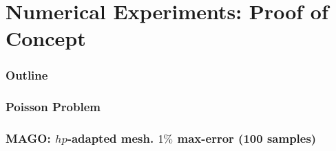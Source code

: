 \documentclass[10pt,aspectratio=149]{beamer}
\begin{document}
\section{Numerical Experiments: Proof of Concept}
\begin{frame}
    \frametitle{Outline}
    \tableofcontents[currentsection]
\end{frame}
\begin{frame}
	\frametitle{Poisson Problem}
	\begin{figure}[t!]
	\end{figure}
\end{frame}
\begin{frame}
	\frametitle{MAGO: $hp$-adapted mesh. $1\%$ max-error (100 samples)}
\end{frame}
\end{document}

